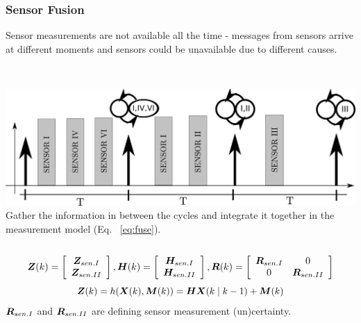 \begin{frame}\frametitle{Sensor Fusion}%
Sensor measurements are not available all the time - messages from sensors arrive at different moments and sensors could be unavailable due to different causes. 
\vspace{-5pt}
\begin{columns}
	 \\
	\vspace{-5pt}
\hspace{3em} \includegraphics[width=0.43\linewidth]{fig/synch.pdf} 
	Gather the information in between the cycles and integrate it together in the measurement model (Eq. ~\ref{eq:fuse}).%
\end{columns}	
\begin{equation}
\label{eq:fuse}
\boldsymbol{Z}(k) = \left[ \begin{array}{c} \boldsymbol{Z}_{sen. I} \\ \boldsymbol{Z}_{sen. II}  \end{array} \right],
\boldsymbol{H}(k) = \left[ \begin{array}{c} \boldsymbol{H}_{sen. I} \\ \boldsymbol{H}_{sen. II}  \end{array} \right], 
\boldsymbol{R}(k) = \left[ \begin{array}{cc} \boldsymbol{R}_{sen. I} & 0 \\ 0 & \boldsymbol{R}_{sen. II} \end{array} \right]
\end{equation}
\vspace{-10pt}	
	\begin{equation*}
	\boldsymbol{Z}(k) = h(\boldsymbol{X}(k), \boldsymbol{M}(k)) = \boldsymbol{H} \boldsymbol{X}(k \mid k-1)  + \boldsymbol{M}(k)
	\end{equation*}
$\boldsymbol{R}_{sen. I}$ and $\boldsymbol{R}_{sen. II}$ are defining sensor measurement (un)certainty.
\end{frame}